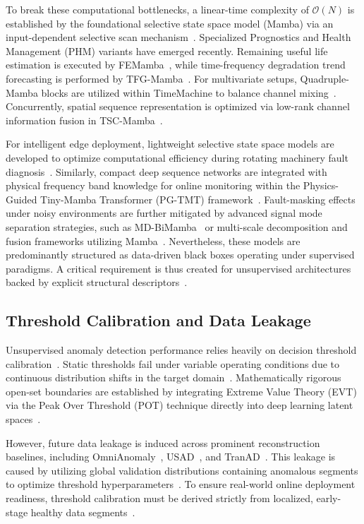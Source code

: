 \documentclass[cmes,article,submit,moreauthors,pdftex]{Definitions/tsp}
\begin{document}
To break these computational bottlenecks, a linear-time complexity of $\mathcal{O}(N)$ is established by the foundational selective state space model (Mamba) via an input-dependent selective scan mechanism~\cite{ref-5}. Specialized Prognostics and Health Management (PHM) variants have emerged recently. Remaining useful life estimation is executed by FEMamba~\cite{ref-6}, while time-frequency degradation trend forecasting is performed by TFG-Mamba~\cite{ref-7}. For multivariate setups, Quadruple-Mamba blocks are utilized within TimeMachine to balance channel mixing~\cite{ref-8}. Concurrently, spatial sequence representation is optimized via low-rank channel information fusion in TSC-Mamba~\cite{ref-13}.

For intelligent edge deployment, lightweight selective state space models are developed to optimize computational efficiency during rotating machinery fault diagnosis~\cite{ref-14}. Similarly, compact deep sequence networks are integrated with physical frequency band knowledge for online monitoring within the Physics-Guided Tiny-Mamba Transformer (PG-TMT) framework~\cite{ref-15}. Fault-masking effects under noisy environments are further mitigated by advanced signal mode separation strategies, such as MD-BiMamba~\cite{ref-16} or multi-scale decomposition and fusion frameworks utilizing Mamba~\cite{ref-17}. Nevertheless, these models are predominantly structured as data-driven black boxes operating under supervised paradigms. A critical requirement is thus created for unsupervised architectures backed by explicit structural descriptors~\cite{ref-15,ref-9}.

\subsection{Threshold Calibration and Data Leakage} \label{sect:s2dot3}
Unsupervised anomaly detection performance relies heavily on decision threshold calibration~\cite{ref-9}. Static thresholds fail under variable operating conditions due to continuous distribution shifts in the target domain~\cite{ref-9}. Mathematically rigorous open-set boundaries are established by integrating Extreme Value Theory (EVT) via the Peak Over Threshold (POT) technique directly into deep learning latent spaces~\cite{ref-10}.

However, future data leakage is induced across prominent reconstruction baselines, including OmniAnomaly~\cite{ref-18}, USAD~\cite{ref-19}, and TranAD~\cite{ref-20}. This leakage is caused by utilizing global validation distributions containing anomalous segments to optimize threshold hyperparameters~\cite{ref-18,ref-19,ref-20}. To ensure real-world online deployment readiness, threshold calibration must be derived strictly from localized, early-stage healthy data segments~\cite{ref-9}.
\end{document}
